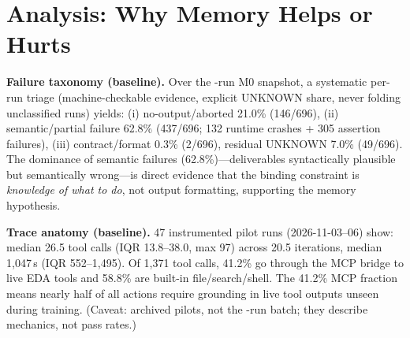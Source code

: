 \section{Analysis: Why Memory Helps or Hurts}
\label{sec:analysis}

\textbf{Failure taxonomy (baseline).} Over the \Neval{}-run M0 snapshot, a systematic per-run triage (machine-checkable evidence, explicit UNKNOWN share, never folding unclassified runs) yields: (i) no-output/aborted 21.0\% (146/696), (ii) semantic/partial failure 62.8\% (437/696; 132 runtime crashes + 305 assertion failures), (iii) contract/format 0.3\% (2/696), residual UNKNOWN 7.0\% (49/696). The dominance of semantic failures (62.8\%)---deliverables syntactically plausible but semantically wrong---is direct evidence that the binding constraint is \emph{knowledge of what to do}, not output formatting, supporting the memory hypothesis.

\textbf{Trace anatomy (baseline).} 47 instrumented pilot runs (2026-11-03--06) show: median 26.5 tool calls (IQR 13.8--38.0, max 97) across 20.5 iterations, median 1{,}047\,s (IQR 552--1{,}495). Of 1{,}371 tool calls, 41.2\% go through the MCP bridge to live EDA tools and 58.8\% are built-in file/search/shell. The 41.2\% MCP fraction means nearly half of all actions require grounding in live tool outputs unseen during training. (Caveat: archived pilots, not the \Neval{}-run batch; they describe mechanics, not pass rates.)

